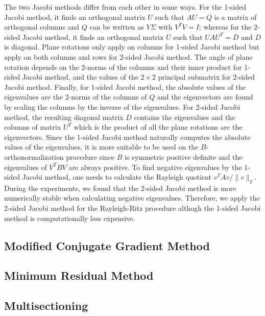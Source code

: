 The two Jacobi methods differ from each other in some ways. For the 1-sided Jacobi method, it finds an orthogonal
matrix $U$ such that $A U = Q$ is a matrix of orthogonal columns and $Q$ can be written as $V \Sigma$ with
$V^T V = I$; whereas for the 2-sided Jacobi method, it finds an orthogonal matrix $U$ such that $UAU^T = D$ and
$D$ is diagonal. Plane rotations only apply on columns for 1-sided Jacobi method but apply on both columns and rows
for 2-sided Jacobi method. The angle of plane rotation depends on the 2-norms of the columns and their inner
product for 1-sided Jacobi method, and the values of the $2 \times 2$ principal submatrix for 2-sided Jacobi method.
Finally, for 1-sided Jacobi method, the absolute values of the eigenvalues are the 2-norms of the columns of $Q$ and
the eigenvectors are found by scaling the columns by the inverse of the eigenvalues. For 2-sided Jacobi method, the
resulting diagonal matrix $D$ contains the eigenvalues and the columns of matrix $U^T$ which is the product of all
the plane rotations are the eigenvectors. Since the 1-sided Jacobi method naturally computes the absolute values of
the eigenvalues, it is more suitable to be used on the $B$-orthonormalization procedure since $B$ is symmetric
positive definite and the eigenvalues of $V^T B V$ are always positive. To find negative eigenvalues by the 1-sided
Jacobi method, one needs to calculate the Rayleigh quotient $v^T A v / \|v\|_2$. During the experiments, we found
that the 2-sided Jacobi method is more numerically stable when calculating negative eigenvalues. Therefore, we
apply the 2-sided Jacobi method for the Rayleigh-Ritz procedure althogh the 1-sided Jacobi method is computationally
less expensive.

\subsection{Modified Conjugate Gradient Method}

\subsection{Minimum Residual Method}

\subsection{Multisectioning}
